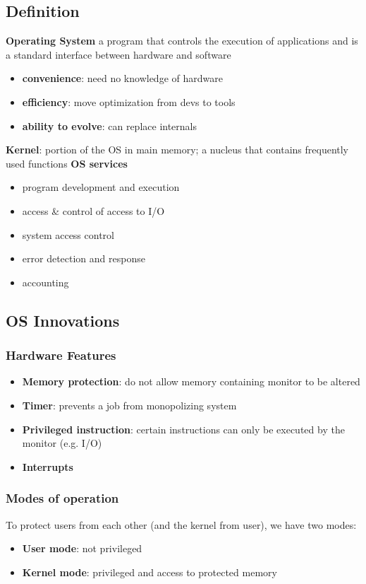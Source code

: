 \documentclass[]{article}
\theoremstyle{definition}
\begin{document}
		\subsection{Definition}
			\textbf{Operating System} a program that controls the execution of applications and is a standard interface between hardware and software
			\begin{itemize}
				\item \textbf{convenience}: need no knowledge of hardware
				\item \textbf{efficiency}: move optimization from devs to tools
				\item \textbf{ability to evolve}: can replace internals
			\end{itemize}
			\textbf{Kernel}: portion of the OS in main memory; a nucleus that contains frequently used functions
			\textbf{OS services}
			\begin{itemize}
				\item program development and execution
				\item access \& control of access to I/O
				\item system access control
				\item error detection and response
				\item accounting
			\end{itemize}
		\subsection{OS Innovations}
			\subsubsection{Hardware Features}
				\begin{itemize}
					\item \textbf{Memory protection}: do not allow memory containing monitor to be altered
					\item \textbf{Timer}: prevents a job from monopolizing system
					\item \textbf{Privileged instruction}: certain instructions can only be executed by the monitor (e.g. I/O)
					\item \textbf{Interrupts}
				\end{itemize}
			\subsubsection{Modes of operation}
				To protect users from each other (and the kernel from user), we have two modes:
				\begin{itemize}
					\item \textbf{User mode}: not privileged
					\item \textbf{Kernel mode}: privileged and access to protected memory
				\end{itemize}
\end{document}
